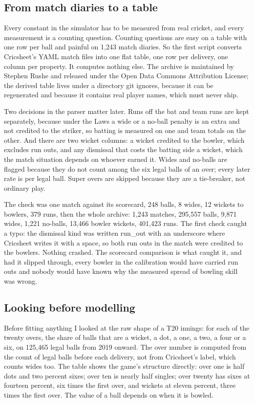\documentclass[11pt,letterpaper]{article}
\begin{document}
\subsection{From match diaries to a table}

Every constant in the simulator has to be measured from real cricket, and every measurement is a counting question. Counting questions are easy on a table with one row per ball and painful on 1,243 match diaries. So the first script converts Cricsheet's YAML match files into one flat table, one row per delivery, one column per property. It computes nothing else. The archive is maintained by Stephen Rushe and released under the Open Data Commons Attribution License; the derived table lives under a directory git ignores, because it can be regenerated and because it contains real player names, which must never ship.


Two decisions in the parser matter later. Runs off the bat and team runs are kept separately, because under the Laws a wide or a no-ball penalty is an extra and not credited to the striker, so batting is measured on one and team totals on the other. And there are two wicket columns: a wicket credited to the bowler, which excludes run outs, and any dismissal that costs the batting side a wicket, which the match situation depends on whoever earned it. Wides and no-balls are flagged because they do not count among the six legal balls of an over; every later rate is per legal ball. Super overs are skipped because they are a tie-breaker, not ordinary play.


The check was one match against its scorecard, 248 balls, 8 wides, 12 wickets to bowlers, 379 runs, then the whole archive: 1,243 matches, 295,557 balls, 9,871 wides, 1,221 no-balls, 13,466 bowler wickets, 401,423 runs. The first check caught a typo: the dismissal kind was written run\_out with an underscore where Cricsheet writes it with a space, so both run outs in the match were credited to the bowlers. Nothing crashed. The scorecard comparison is what caught it, and had it slipped through, every bowler in the calibration would have carried run outs and nobody would have known why the measured spread of bowling skill was wrong.


\subsection{Looking before modelling}

Before fitting anything I looked at the raw shape of a T20 innings: for each of the twenty overs, the share of balls that are a wicket, a dot, a one, a two, a four or a six, on 125,465 legal balls from 2019 onward. The over number is computed from the count of legal balls before each delivery, not from Cricsheet's label, which counts wides too. The table shows the game's structure directly: over one is half dots and two percent sixes; over ten is nearly half singles; over twenty has sixes at fourteen percent, six times the first over, and wickets at eleven percent, three times the first over. The value of a ball depends on when it is bowled.
\end{document}
